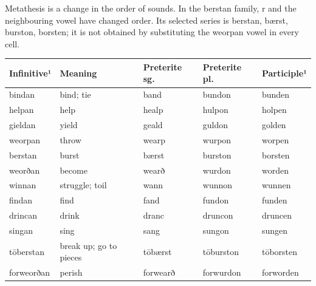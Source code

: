 Metathesis is a change in the order of sounds. In the berstan family, r and the neighbouring vowel have changed order. Its selected series is berstan, bærst, burston, borsten; it is not obtained by substituting the weorpan vowel in every cell.

\par\begingroup
\fontsize{10.5}{13.2}\selectfont
\setlength{\LTleft}{0pt}\setlength{\LTright}{\fill}
\noindent
\begin{tabular}{@{}>{\raggedright\arraybackslash}p{21.22mm}>{\raggedright\arraybackslash}p{28.65mm}>{\raggedright\arraybackslash}p{20.83mm}>{\raggedright\arraybackslash}p{20.83mm}>{\raggedright\arraybackslash}p{21.22mm}@{}}
\toprule
\textbf{Infinitive¹} & \textbf{Meaning} & \textbf{Preterite sg.} & \textbf{Preterite pl.} & \textbf{Participle¹} \\
\midrule
bindan & bind; tie & band & bundon & bunden \\
helpan & help & healp & hulpon & holpen \\
gieldan & yield & geald & guldon & golden \\
weorpan & throw & wearp & wurpon & worpen \\
berstan & burst & bærst & burston & borsten \\
weorðan & become & wearð & wurdon & worden \\
winnan & struggle; toil & wann & wunnon & wunnen \\
findan & find & fand & fundon & funden \\
drincan & drink & dranc & druncon & druncen \\
singan & sing & sang & sungon & sungen \\
tōberstan & break up; go to pieces & tōbærst & tōburston & tōborsten \\
forweorðan & perish & forwearð & forwurdon & forworden \\
\bottomrule
\end{tabular}
\par\endgroup

